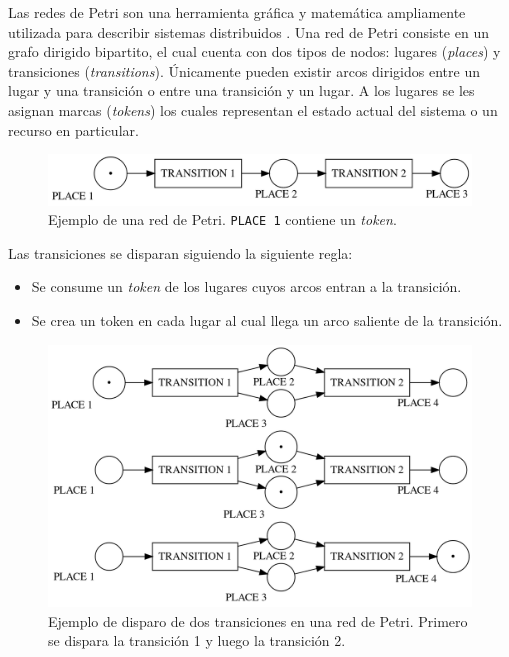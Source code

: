 \documentclass[12pt]{article}
\begin{document}
Las redes de Petri son una herramienta gráfica y matemática ampliamente utilizada para describir sistemas distribuidos \cite{murata1989}.
Una red de Petri consiste en un grafo dirigido bipartito, el cual cuenta con dos tipos de nodos: lugares (\textit{places}) y transiciones (\textit{transitions}).
Únicamente pueden existir arcos dirigidos entre un lugar y una transición o entre una transición y un lugar.
A los lugares se les asignan marcas (\textit{tokens}) los cuales representan el estado actual del sistema o un recurso en particular.

\begin{figure}[H]
    \centering
    \includegraphics[scale=0.25]{petri-net-example.png}
    \caption{Ejemplo de una red de Petri. \texttt{PLACE 1} contiene un \textit{token}.}
\end{figure}

Las transiciones se disparan siguiendo la siguiente regla:
\begin{itemize}
    \item Se consume un \textit{token} de los lugares cuyos arcos entran a la transición.
    \item Se crea un token en cada lugar al cual llega un arco saliente de la transición.
\end{itemize}

\begin{figure}[H]
    \centering
    \includegraphics[scale=0.25]{petri-net-transition-firing-example.png}
    \caption{Ejemplo de disparo de dos transiciones en una red de Petri. Primero se dispara la transición 1 y luego la transición 2.}
\end{figure}
\end{document}
